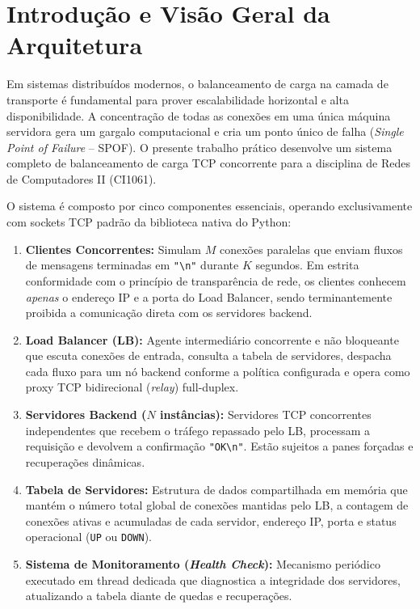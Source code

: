 \documentclass[11pt,a4paper]{article}
\begin{document}

\clearpage

\setcounter{page}{1}

\section{Introdução e Visão Geral da Arquitetura}

Em sistemas distribuídos modernos, o balanceamento de carga na camada de transporte é fundamental para prover escalabilidade horizontal e alta disponibilidade. A concentração de todas as conexões em uma única máquina servidora gera um gargalo computacional e cria um ponto único de falha (\textit{Single Point of Failure} -- SPOF). O presente trabalho prático desenvolve um sistema completo de balanceamento de carga TCP concorrente para a disciplina de Redes de Computadores II (CI1061).

O sistema é composto por cinco componentes essenciais, operando exclusivamente com sockets TCP padrão da biblioteca nativa do Python:
\begin{enumerate}
    \item \textbf{Clientes Concorrentes:} Simulam $M$ conexões paralelas que enviam fluxos de mensagens terminadas em \texttt{"\textbackslash n"} durante $K$ segundos. Em estrita conformidade com o princípio de transparência de rede, os clientes conhecem \textit{apenas} o endereço IP e a porta do Load Balancer, sendo terminantemente proibida a comunicação direta com os servidores backend.
    \item \textbf{Load Balancer (LB):} Agente intermediário concorrente e não bloqueante que escuta conexões de entrada, consulta a tabela de servidores, despacha cada fluxo para um nó backend conforme a política configurada e opera como proxy TCP bidirecional (\textit{relay}) full-duplex.
    \item \textbf{Servidores Backend ($N$ instâncias):} Servidores TCP concorrentes independentes que recebem o tráfego repassado pelo LB, processam a requisição e devolvem a confirmação \texttt{"OK\textbackslash n"}. Estão sujeitos a panes forçadas e recuperações dinâmicas.
    \item \textbf{Tabela de Servidores:} Estrutura de dados compartilhada em memória que mantém o número total global de conexões mantidas pelo LB, a contagem de conexões ativas e acumuladas de cada servidor, endereço IP, porta e status operacional (\texttt{UP} ou \texttt{DOWN}).
    \item \textbf{Sistema de Monitoramento (\textit{Health Check}):} Mecanismo periódico executado em thread dedicada que diagnostica a integridade dos servidores, atualizando a tabela diante de quedas e recuperações.
\end{enumerate}
\end{document}
